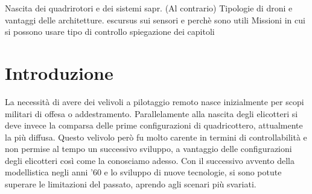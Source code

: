 \begin{scaletta}
	Nascita dei quadrirotori e dei sistemi sapr. (Al contrario)
	Tipologie di droni e vantaggi delle architetture. escursus sui sensori e perchè sono utili
	Missioni in cui si possono usare
	tipo di controllo
	spiegazione dei capitoli
\end{scaletta}
\chapter{Introduzione}
La necessità di avere dei velivoli a pilotaggio remoto nasce inizialmente per scopi militari di offesa o addestramento. Parallelamente alla nascita degli elicotteri si deve invece la comparsa delle prime configurazioni di quadricottero, attualmente la più diffusa. Questo velivolo però fu molto carente in termini di controllabilità e non permise al tempo un successivo sviluppo, a vantaggio delle configurazioni degli elicotteri così come la conosciamo adesso. Con il successivo avvento della modellistica negli anni '60 e lo sviluppo di nuove tecnologie, si sono potute superare le limitazioni del passato, aprendo agli scenari più svariati. 

